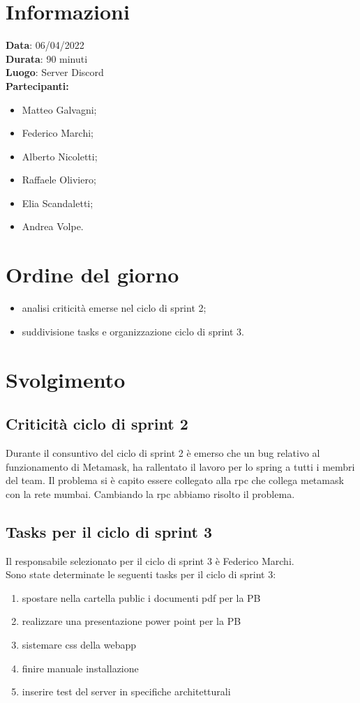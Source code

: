 \documentclass[a4paper, 12pt]{article}
\begin{document}
\makefrontpage

\section{Informazioni}
\textbf{Data}: 06/04/2022\\
\textbf{Durata}: 90 minuti\\
\textbf{Luogo}: Server Discord\\

\textbf{Partecipanti:}
\begin{itemize}
	\item Matteo Galvagni;
	\item Federico Marchi;
	\item Alberto Nicoletti;
	\item Raffaele Oliviero;
	\item Elia Scandaletti;
	\item Andrea Volpe.
\end{itemize}


\section{Ordine del giorno}
\begin{itemize}
	\item analisi criticità emerse nel ciclo di sprint 2;
	\item suddivisione tasks e organizzazione ciclo di sprint 3.
\end{itemize}

\section{Svolgimento}

\subsection{Criticità ciclo di sprint 2}
Durante il consuntivo del ciclo di sprint 2 è emerso che un bug relativo al funzionamento di Metamask, ha rallentato il lavoro per lo spring a tutti i membri del team.
Il problema si è capito essere collegato alla rpc che collega metamask con la rete mumbai. Cambiando la rpc abbiamo risolto il problema.


\subsection{Tasks per il ciclo di sprint 3}
Il responsabile selezionato per il ciclo di sprint 3 è Federico Marchi. \\
Sono state determinate le seguenti tasks per il ciclo di sprint 3:
\begin{enumerate}
	\item spostare nella cartella public i documenti pdf per la PB
	\item realizzare una presentazione power point per la PB
	\item sistemare css della webapp
	\item finire manuale installazione
	\item inserire test del server in specifiche architetturali
\end{enumerate}
\end{document}
